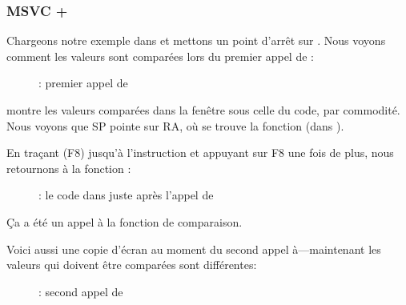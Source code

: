 ﻿\clearpage
\subsubsection{MSVC + \olly}
\myindex{\olly}

Chargeons notre exemple dans \olly et mettons un point d'arrêt sur \comp.
Nous voyons comment les valeurs sont comparées lors du premier appel de \comp:

\begin{figure}[H]
\centering
{}
\caption{\olly: premier appel de \comp}
\label{fig:qsort_olly1}
\end{figure}

\olly montre les valeurs comparées dans la fenêtre sous celle du code, par commodité.
Nous voyons que \ac{SP} pointe sur \ac{RA}, où se trouve la fonction \qsort (dans
).

\clearpage
En traçant (F8) jusqu'à l'instruction  et appuyant sur F8 une fois de plus,
nous retournons à la fonction \qsort:

\begin{figure}[H]
\centering
{}
\caption{\olly: le code dans \qsort juste après l'appel de \comp}
\label{fig:qsort_olly2}
\end{figure}

Ça a été un appel à la fonction de comparaison.

\clearpage
Voici aussi une copie d'écran au moment du second appel à\comp{}---maintenant les
valeurs qui doivent être comparées sont différentes:

\begin{figure}[H]
\centering
{}
\caption{\olly: second appel de \comp}
\label{fig:qsort_olly3}
\end{figure}
